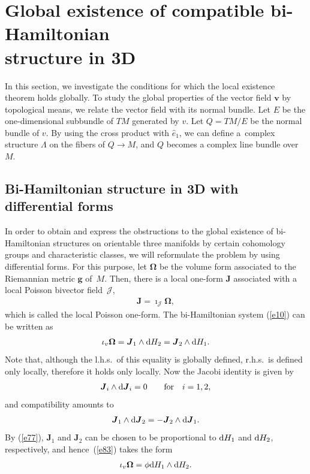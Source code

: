 \documentclass[10pt,a4paper]{amsart}
\numberwithin{equation}{section}
\begin{document}
\section[Global existence of compatible bi-Hamiltonian structure in 3D]{Global existence of compatible bi-Hamiltonian\\ structure in 3D}\label{section3}

In this section, we investigate the conditions for which the local existence theorem holds globally. To study the global properties of the vector f\/ield $\boldsymbol{v}$ by topological means, we relate the vector f\/ield with its normal bundle. Let $E$ be the one-dimensional subbundle of $TM$ generated by $v$. Let $Q=TM/E$ be the normal bundle of $v$. By using the cross product with $\widehat{e}_{1}$, we can def\/ine a~complex structure $\Lambda$ on the f\/ibers of $Q\rightarrow M$, and $Q$ becomes a complex line bundle over~$M$.

\subsection{Bi-Hamiltonian structure in 3D with dif\/ferential forms}\label{section3.1}

In order to obtain and express the obstructions to the global existence of bi-Hamiltonian structures on orientable three manifolds by certain cohomology groups and characteristic classes, we will reformulate the problem by using dif\/ferential forms. For this purpose, let $\boldsymbol{\Omega }$ be the volume form associated to the Riemannian metric $\boldsymbol{g}$ of~$M$. Then, there is a local one-form $\boldsymbol{J}$ associated with a local Poisson bivector f\/ield~$\mathcal{J}$,
\begin{gather*}
\boldsymbol{J}=\imath _{\mathcal{J}}\boldsymbol{\Omega },
\end{gather*}
which is called the local Poisson one-form. The bi-Hamiltonian system (\ref{e10}) can be written as
\begin{gather}
\iota _{v}\boldsymbol{\Omega }=\boldsymbol{J}_{1}\wedge {\rm d}H_{2}=\boldsymbol{J}_{2}\wedge {\rm d}H_{1}. \label{e83}
\end{gather}
Note that, although the l.h.s.\ of this equality is globally def\/ined, r.h.s.\ is def\/ined only locally, therefore it holds only locally. Now the Jacobi identity is given by
\begin{gather}
\boldsymbol{J}_{i}\wedge {\rm d}\boldsymbol{J}_{i}=0\qquad \text{for} \quad i=1,2, \label{e84}
\end{gather}
and compatibility amounts to
\begin{gather*}
\boldsymbol{J}_{1}\wedge {\rm d}\boldsymbol{J}_{2}=-\boldsymbol{J}_{2}\wedge {\rm d}\boldsymbol{J}_{1}.
\end{gather*}
By (\ref{e77}), $\boldsymbol{J}_{1}$ and $\boldsymbol{J}_{2}$ can be chosen to be proportional to ${\rm d}H_{1}$ and ${\rm d}H_{2}$, respectively, and hence~(\ref{e83}) takes the form
\begin{gather*}
\iota _{v}\boldsymbol{\Omega }=\phi {\rm d}H_{1}\wedge {\rm d}H_{2}.
\end{gather*}
\end{document}
